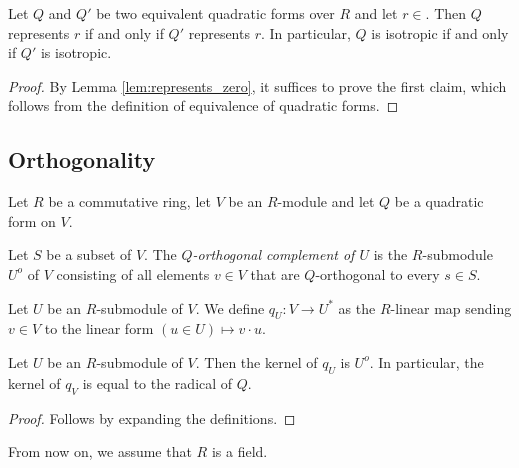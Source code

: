 \begin{lemma}\label{lem:represents_iff}
\leanok
{}
Let $Q$ and $Q'$ be two equivalent quadratic forms over $R$ and let $r \in $. Then $Q$ represents $r$ if and only if $Q'$ represents $r$. In particular, $Q$ is isotropic if and only if $Q'$ is isotropic.
\end{lemma}

\begin{proof}
\leanok
By Lemma \ref{lem:represents_zero}, it suffices to prove the first claim, which follows from the definition of equivalence of quadratic forms.
\end{proof}

\subsection{Orthogonality}\label{subsec:ortho}

Let $R$ be a commutative ring, let $V$ be an $R$-module and let $Q$ be a quadratic form on $V$.

\begin{definition}\label{def:ortho_compl}
\leanok
Let $S$ be a subset of $V$. The \emph{$Q$-orthogonal complement of $U$} is the $R$-submodule $U^o$ of $V$ consisting of all elements $v \in V$ that are $Q$-orthogonal to every $s \in S$.
\end{definition}

\begin{definition}\label{def:to_dual}
\leanok
Let $U$ be an $R$-submodule of $V$. We define $q_U : V \to U^*$ as the $R$-linear map sending $v \in V$ to the linear form $(u \in U) \mapsto v \cdot u$.
\end{definition}

\begin{lemma}\label{lem:ker_to_dual}
Let $U$ be an $R$-submodule of $V$. Then the kernel of $q_U$ is $U^o$. In particular, the kernel of $q_V$ is equal to the radical of $Q$.
\leanok
{}
\end{lemma}
\begin{proof}
\leanok
Follows by expanding the definitions.
\end{proof}

From now on, we assume that $R$ is a field.

